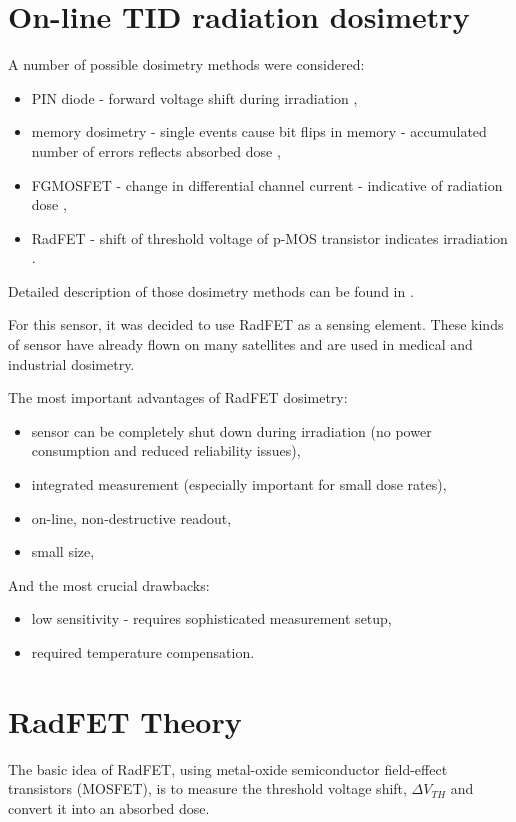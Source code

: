 \section{On-line TID radiation dosimetry}
    A number of possible dosimetry methods were considered:
    \begin{itemize}
        \item PIN diode - forward voltage shift during irradiation \cite{PIN_dosimetry},
        \item memory dosimetry - single events cause bit flips in memory - accumulated number of errors reflects absorbed dose \cite{RadFET_PhD},
        \item FGMOSFET - change in differential channel current - indicative of radiation dose \cite{FGMOSFET_patent},
        \item RadFET - shift of threshold voltage of p-MOS transistor indicates irradiation \cite{RadFET_PhD}.
    \end{itemize}
    Detailed description of those dosimetry methods can be found in \cite{RadFET_PhD}.

    For this sensor, it was decided to use RadFET as a sensing element. These kinds of sensor have already flown on many satellites and are used in medical and industrial dosimetry.

    The most important advantages of RadFET dosimetry:
    \begin{itemize}
        \item sensor can be completely shut down during irradiation (no power consumption and reduced reliability issues),
        \item integrated measurement (especially important for small dose rates),
        \item on-line, non-destructive readout,
        \item small size,
    \end{itemize}
    And the most crucial drawbacks:
    \begin{itemize}
        \item low sensitivity - requires sophisticated measurement setup,
        \item required temperature compensation.
    \end{itemize}


\section{RadFET Theory}
    The basic idea of RadFET, using metal-oxide semiconductor field-effect transistors (MOSFET), is to measure the threshold voltage shift, $\Delta V_{TH}$ and convert it into an absorbed dose.

